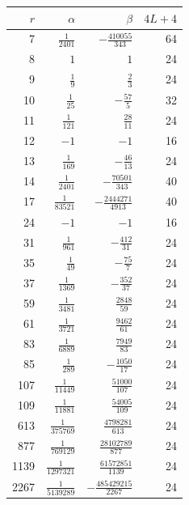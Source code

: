 \begin{center}
\renewcommand{\arraystretch}{1.4}
\begin{tabular}{r@{\qquad}r@{\qquad}r@{\qquad}r}
\toprule
$r$&$\alpha$&$\beta$&$4L+4$\\
\midrule
7&$\frac{1}{2401}$&$-\frac{410055}{343}$&64\\
8&$1$&$1$&24\\
9&$\frac{1}{9}$&$\frac{2}{3}$&24\\
10&$\frac{1}{25}$&$-\frac{57}{5}$&32\\
11&$\frac{1}{121}$&$\frac{28}{11}$&24\\
12&$-1$&$-1$&16\\
13&$\frac{1}{169}$&$-\frac{46}{13}$&24\\
14&$\frac{1}{2401}$&$-\frac{70501}{343}$&40\\
17&$\frac{1}{83521}$&$-\frac{2444271}{4913}$&40\\
24&$-1$&$-1$&16\\
31&$\frac{1}{961}$&$-\frac{412}{31}$&24\\
35&$\frac{1}{49}$&$-\frac{75}{7}$&24\\
37&$\frac{1}{1369}$&$-\frac{352}{37}$&24\\
59&$\frac{1}{3481}$&$\frac{2848}{59}$&24\\
61&$\frac{1}{3721}$&$\frac{9462}{61}$&24\\
83&$\frac{1}{6889}$&$\frac{7949}{83}$&24\\
85&$\frac{1}{289}$&$-\frac{1050}{17}$&24\\
107&$\frac{1}{11449}$&$\frac{51000}{107}$&24\\
109&$\frac{1}{11881}$&$\frac{54005}{109}$&24\\
613&$\frac{1}{375769}$&$\frac{4798281}{613}$&24\\
877&$\frac{1}{769129}$&$\frac{28102789}{877}$&24\\
1139&$\frac{1}{1297321}$&$\frac{61572851}{1139}$&24\\
2267&$\frac{1}{5139289}$&$-\frac{485429215}{2267}$&24\\
\bottomrule
\end{tabular}
\end{center}
